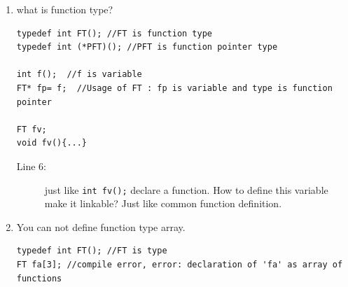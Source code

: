 \documentclass[a4paper,11pt,twoside]{book}
\begin{document}
\begin{itemize}
\begin{enumerate}
	\item what is function type?
\begin{lstlisting}
typedef int FT(); //FT is function type
typedef int (*PFT)(); //PFT is function pointer type

int f();  //f is variable
FT* fp= f;  //Usage of FT : fp is variable and type is function pointer

FT fv; 
void fv(){...} 
\end{lstlisting}
	\begin{description}

		\item[Line 6:] just like \texttt{int fv();} declare a function. How to define this variable make it linkable? Just like common function definition.
	\end{description}
	
	\item You can not define function type array.
\begin{lstlisting}
typedef int FT(); //FT is type
FT fa[3]; //compile error, error: declaration of 'fa' as array of functions
\end{lstlisting}

\end{enumerate}
\end{itemize}
\end{document}
